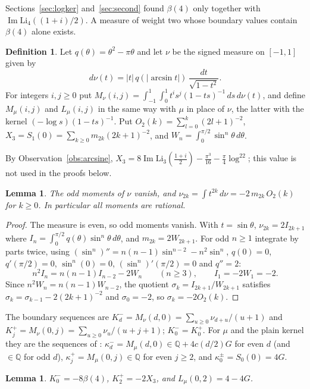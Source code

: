\documentclass[11pt]{article}
\newtheorem{lemma}[theorem]{Lemma}
\theoremstyle{definition}
\newtheorem{definition}[theorem]{Definition}
\begin{document}
Sections~\ref{sec:logker} and~\ref{sec:second} found $\beta(4)$ only together with $\operatorname{Im}\mathrm{Li}_4((1+i)/2)$. A measure of weight two whose boundary values contain $\beta(4)$ alone exists.

\begin{definition}\label{def:nu}
Let $q(\theta)=\theta^2-\pi\theta$ and let $\nu$ be the signed measure on $[-1,1]$ given by
\[
d\nu(t)=|t|\,q(|\arcsin t|)\,\frac{dt}{\sqrt{1-t^2}} .
\]
For integers $i,j\ge0$ put $M_\nu(i,j)=\int_{-1}^{1}\int_0^1 t^is^j(1-ts)^{-1}\,ds\,d\nu(t)$, and define $M_\mu(i,j)$ and $L_\mu(i,j)$ in the same way with $\mu$ in place of $\nu$, the latter with the kernel $(-\log s)(1-ts)^{-1}$. Put $O_2(k)=\sum_{l=0}^{k}(2l+1)^{-2}$, $X_3=S_1(0)=\sum_{k\ge0}m_{2k}(2k+1)^{-2}$, and $W_n=\int_0^{\pi/2}\sin^n\theta\,d\theta$.
\end{definition}

By Observation~\ref{obs:arcsine}, $X_3=8\operatorname{Im}\mathrm{Li}_3(\frac{1+i}2)-\frac{\pi^3}{16}-\frac\pi4\log^22$; this value is not used in the proofs below.

\begin{lemma}\label{lem:numoments}
The odd moments of $\nu$ vanish, and $\nu_{2k}=\int t^{2k}\,d\nu=-2\,m_{2k}\,O_2(k)$ for $k\ge0$. In particular all moments are rational.
\end{lemma}

\begin{proof}
The measure is even, so odd moments vanish. With $t=\sin\theta$, $\nu_{2k}=2I_{2k+1}$ where $I_n=\int_0^{\pi/2}q(\theta)\sin^n\theta\,d\theta$, and $m_{2k}=2W_{2k+1}$. For odd $n\ge1$ integrate by parts twice, using $(\sin^n)''=n(n-1)\sin^{n-2}-n^2\sin^n$, $q(0)=0$, $q'(\pi/2)=0$, $\sin^n(0)=0$, $(\sin^n)'(\pi/2)=0$ and $q''=2$:
\[
n^2I_n=n(n-1)I_{n-2}-2W_n\qquad(n\ge3),\qquad I_1=-2W_1=-2 .
\]
Since $n^2W_n=n(n-1)W_{n-2}$, the quotient $\sigma_k=I_{2k+1}/W_{2k+1}$ satisfies $\sigma_k=\sigma_{k-1}-2(2k+1)^{-2}$ and $\sigma_0=-2$, so $\sigma_k=-2O_2(k)$.
\end{proof}

The boundary sequences are $K^-_d=M_\nu(d,0)=\sum_{u\ge0}\nu_{d+u}/(u+1)$ and $K^+_j=M_\nu(0,j)=\sum_{u\ge0}\nu_u/(u+j+1)$; $K^-_0=K^+_0$. For $\mu$ and the plain kernel they are the sequences of \cite[Sec.~2.1]{OAI}: $\kappa^-_d=M_\mu(d,0)\in\mathbb Q+4c(d/2)G$ for even $d$ (and $\in\mathbb Q$ for odd $d$), $\kappa^+_j=M_\mu(0,j)\in\mathbb Q$ for even $j\ge2$, and $\kappa^\pm_0=S_0(0)=4G$.

\begin{lemma}\label{lem:nubase}
$K^-_0=-8\beta(4)$, $K^+_2=-2X_3$, and $L_\mu(0,2)=4-4G$.
\end{lemma}
\end{document}
